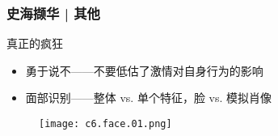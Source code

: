 \begin{frame}
  \frametitle{史海撷华 | 其他}
  \begin{block}{真正的疯狂}
  \begin{itemize}
    \item 勇于说不——不要低估了激情对自身行为的影响
    \item 面部识别——整体 vs. 单个特征，脸 vs. 模拟肖像
  \end{itemize}
  \vspace{-1em}
  \begin{figure}
    \centering
    \texttt{[image: c6.face.01.png]}
  \end{figure}
  \end{block}
\end{frame}



